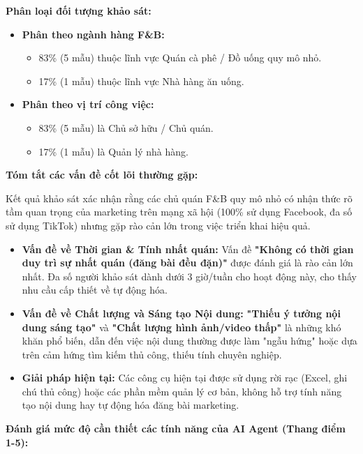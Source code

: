 \textbf{Phân loại đối tượng khảo sát:}

\begin{itemize}
\item
  \textbf{Phân theo ngành hàng F\&B:}

  \begin{itemize}
  \item
    83\% (5 mẫu) thuộc lĩnh vực Quán cà phê / Đồ uống quy mô nhỏ.
  \item
    17\% (1 mẫu) thuộc lĩnh vực Nhà hàng ăn uống.
  \end{itemize}
\item
  \textbf{Phân theo vị trí công việc:}

  \begin{itemize}
  \item
    83\% (5 mẫu) là Chủ sở hữu / Chủ quán.
  \item
    17\% (1 mẫu) là Quản lý nhà hàng.
  \end{itemize}
\end{itemize}

\textbf{Tóm tắt các vấn đề cốt lõi thường gặp:}

Kết quả khảo sát xác nhận rằng các chủ quán F\&B quy mô nhỏ có nhận thức
rõ tầm quan trọng của marketing trên mạng xã hội (100\% sử dụng
Facebook, đa số sử dụng TikTok) nhưng gặp rào cản lớn trong việc triển
khai hiệu quả.

\begin{itemize}
\item
  \textbf{Vấn đề về Thời gian \& Tính nhất quán:} Vấn đề \textbf{"Không
  có thời gian duy trì sự nhất quán (đăng bài đều đặn)"} được đánh giá
  là rào cản lớn nhất. Đa số người khảo sát dành dưới 3 giờ/tuần cho
  hoạt động này, cho thấy nhu cầu cấp thiết về tự động hóa.
\item
  \textbf{Vấn đề về Chất lượng và Sáng tạo Nội dung:} \textbf{"Thiếu ý
  tưởng nội dung sáng tạo"} và \textbf{"Chất lượng hình ảnh/video thấp"}
  là những khó khăn phổ biến, dẫn đến việc nội dung thường được làm
  "ngẫu hứng" hoặc dựa trên cảm hứng tìm kiếm thủ công, thiếu tính
  chuyên nghiệp.
\item
  \textbf{Giải pháp hiện tại:} Các công cụ hiện tại được sử dụng rời rạc
  (Excel, ghi chú thủ công) hoặc các phần mềm quản lý cơ bản, không hỗ
  trợ tính năng tạo nội dung hay tự động hóa đăng bài marketing.
\end{itemize}

\textbf{Đánh giá mức độ cần thiết các tính năng của AI Agent (Thang điểm
1-5):}

